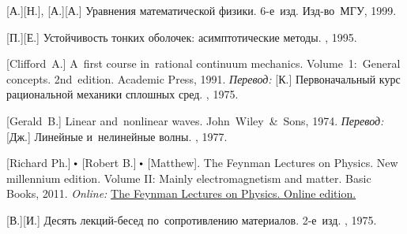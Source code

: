 \begin{thebibliography}{123}
\begin{otherlanguage}{russian}
[А.][Н.], [А.][А.] Уравнения математической физики. 6\hbox{-}е~изд. Изд\hbox{-}во~МГУ, 1999. 

[П.][Е.] Устойчивость тонких оболочек: асимптотические методы. \naukapublisher, 1995. 

[Clifford~A.] A~first course in~rational continuum mechanics. Volume~1:~General concepts. 2nd~edition. Academic Press, 1991.  %
\emph{Перевод:} [К.] Первоначальный курс рациональной механики сплошных сред. \mirpublisher, 1975. 

[Gerald~B.] Linear and~nonlinear waves. John~Wiley~\&~Sons, 1974. 
\emph{Перевод:} [Дж.] Линейные и~нелинейные волны. \mirpublisher, 1977. 


[Richard Ph.] ${\hspace{-0.2ex}\bigdot}$ [Robert B.] ${\hspace{-0.2ex}\bigdot}$ [Matthew]. The Feynman Lectures on Physics. New millennium edition. Volume II: Mainly electromagnetism and matter. Basic Books, 2011. 
\emph{Online:}
\href{http://www.feynmanlectures.caltech.edu/}{The Feynman Lectures on Physics. Online edition.}

[В.][И.] Десять лекций\hbox{-}бесед по~сопротивлению материалов. 2\hbox{-}е~изд. \naukapublisher, 1975. 


\end{otherlanguage}
\end{thebibliography}
